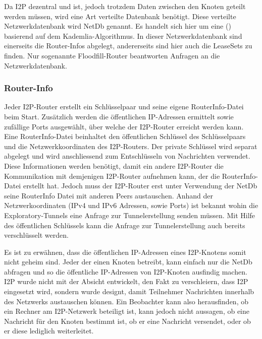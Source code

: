 Da I2P dezentral und  ist, jedoch trotzdem Daten zwischen den Knoten geteilt werden müssen, wird eine Art verteilte Datenbank benötigt.
Diese verteilte Netzwerkdatenbank wird NetDb genannt.
Es handelt sich hier um eine  () basierend auf dem Kademlia-Algorithmus.
In dieser Netzwerkdatenbank sind einerseits die Router-Infos abgelegt,
andererseits sind hier auch die LeaseSets zu finden.
Nur sogenannte Floodfill-Router beantworten Anfragen an die Netzwerkdatenbank.\\
\parencites[S.~5-6]{timpanaro_monitoring_2011}{noauthor_network_nodate}

\subsubsection{Router-Info}\label{sec:router_info}

Jeder I2P-Router erstellt ein Schlüsselpaar und seine eigene RouterInfo-Datei beim Start.
Zusätzlich werden die öffentlichen IP-Adressen ermittelt sowie zufällige Ports ausgewählt, über welche der I2P-Router erreicht werden kann.
Eine RouterInfo-Datei beinhaltet den öffentlichen Schlüssel des Schlüsselpaars und die Netzwerkkoordinaten des I2P-Routers.
Der private Schlüssel wird separat abgelegt und wird anschliessend zum Entschlüsseln von Nachrichten verwendet.
Diese Informationen werden benötigt, damit ein andere I2P-Router die Kommunikation mit demjenigen I2P-Router aufnehmen kann, der die RouterInfo-Datei erstellt hat.
Jedoch muss der I2P-Router erst unter Verwendung der NetDb seine RouterInfo Datei mit anderen Peers austauschen.
Anhand der Netzwerkoordinaten (IPv4 und IPv6 Adressen, sowie Ports) ist bekannt wohin die Exploratory-Tunnels eine Anfrage zur Tunnelerstellung senden müssen.
Mit Hilfe des öffentlichen Schlüssels kann die Anfrage zur Tunnelerstellung auch bereits verschlüsselt werden. 

Es ist zu erwähnen, dass die öffentlichen IP-Adressen eines I2P-Knotens somit nicht geheim sind.
Jeder der einen Knoten betreibt, kann einfach nur die NetDb abfragen und so die öffentliche IP-Adressen von I2P-Knoten ausfindig machen.
I2P wurde nicht mit der Absicht entwickelt, den Fakt zu verschleiern, dass I2P eingesetzt wird,
sondern wurde designt, damit Teilnehmer Nachrichten innerhalb des Netzwerks austauschen können. 
Ein Beobachter kann also herausfinden, ob ein Rechner am I2P-Netzwerk beteiligt ist, kann jedoch nicht aussagen, ob eine Nachricht für den Knoten bestimmt ist, ob er eine Nachricht versendet, oder ob er diese lediglich weiterleitet.

